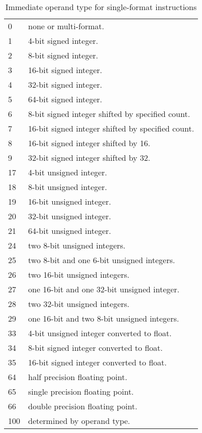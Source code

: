 \documentclass[forwardcom.tex]{subfiles}
\begin{document}
\begin{longtable} {|p{18mm}|p{100mm}|}
\caption{
Immediate operand type for single-format instructions} 
\label{table:immediateOperantTypesInInstructionList}
\\
\endfirsthead
\endhead
\hline
0 & none or multi-format. \\
1 & 4-bit signed integer. \\
2 & 8-bit signed integer. \\
3 & 16-bit signed integer. \\
4 & 32-bit signed integer. \\
5 & 64-bit signed integer. \\
6 & 8-bit signed integer shifted by specified count. \\
7 & 16-bit signed integer shifted by specified count. \\
8 & 16-bit signed integer shifted by 16. \\
9 & 32-bit signed integer shifted by 32. \\
17 & 4-bit unsigned integer. \\
18 & 8-bit unsigned integer. \\
19 & 16-bit unsigned integer. \\
20 & 32-bit unsigned integer. \\
21 & 64-bit unsigned integer. \\
24 & two 8-bit unsigned integers. \\
25 & two 8-bit and one 6-bit unsigned integers. \\
26 & two 16-bit unsigned integers. \\
27 & one 16-bit and one 32-bit unsigned integer. \\
28 & two 32-bit unsigned integers. \\
29 & one 16-bit and two 8-bit unsigned integers. \\
33 & 4-bit unsigned integer converted to float. \\
34 & 8-bit signed integer converted to float. \\
35 & 16-bit signed integer converted to float. \\
64 & half precision floating point. \\
65 & single precision floating point. \\
66 & double precision floating point. \\
100 & determined by operand type. \\
\hline
\end{longtable}
\end{document}
